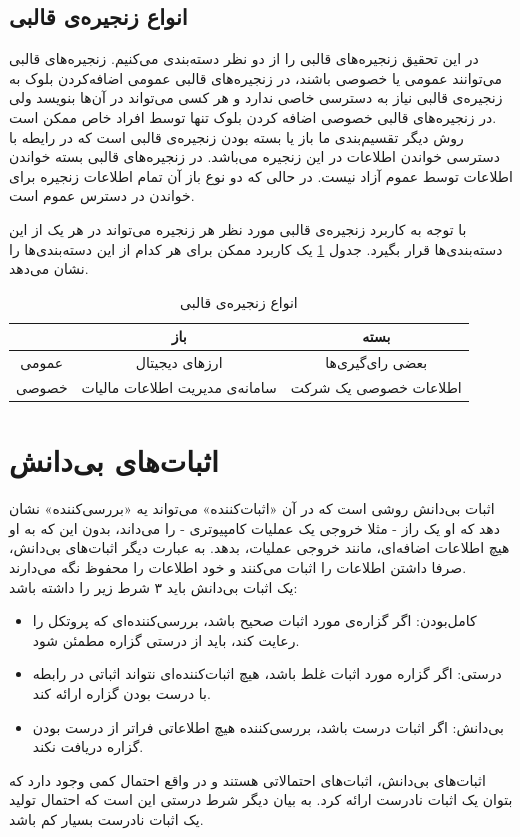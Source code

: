  \subsection{انواع زنجیره‌ی قالبی}
 در این تحقیق زنجیره‌های قالبی‌ را از دو نظر دسته‌‌بندی می‌کنیم. زنجیره‌های قالبی‌ می‌توانند عمومی یا خصوصی باشند، در زنجیره‌های قالبی‌ عمومی اضافه‌کردن بلوک به زنجیره‌ی قالبی نیاز به دسترسی خاصی ندارد و هر کسی می‌تواند در آن‌ها بنویسد ولی در زنجیره‌های قالبی خصوصی اضافه کردن بلوک تنها توسط افراد خاص ممکن است. 
 \\
 روش دیگر تقسیم‌بندی ما باز یا بسته بودن زنجیره‌ی قالبی است که در رایطه با دسترسی خواندن اطلاعات در این زنجیره می‌باشد. در زنجیره‌های قالبی‌ بسته خواندن اطلاعات توسط عموم آزاد نیست. در حالی که دو نوع باز آن تمام اطلاعات زنجیره برای خواندن در دسترس عموم است.
\par
با توجه به کاربرد زنجیره‌ی قالبی مورد نظر هر زنجیره‌ می‌تواند در هر یک از این دسته‌بندی‌ها قرار بگیرد. جدول  \ref{tab:tch} یک کاربرد ممکن برای هر کدام از این دسته‌بندی‌ها را نشان می‌دهد.

\begin{table}[h]
	\begin{center}
		\caption{انواع زنجیره‌ی قالبی}
		\begin{tabular}{|c|c|c|}
			\hline
			& باز & بسته \\
			\hline
			عمومی & ارز‌های دیجیتال & بعضی رای‌گیری‌ها \\
			\hline
			خصوصی & سامانه‌ی مدیریت اطلاعات مالیات & اطلاعات خصوصی یک شرکت \\
			\hline

		\end{tabular}
		\label{tab:tch}
	\end{center}
\end{table}


 
 
\section{اثبات‌های بی‌دانش}
اثبات‌ بی‌دانش 
روشی است که در آن «اثبات‌کننده» می‌تواند یه «بررسی‌کننده» نشان دهد که او یک راز - مثلا خروجی یک عملیات کامپیوتری - را می‌داند، بدون این که به او هیچ اطلاعات اضافه‌ای، مانند خروجی عملیات، بدهد. به عبارت دیگر اثبات‌های بی‌دانش، صرفا داشتن اطلاعات را اثبات می‌کنند و خود اطلاعات را محفوظ نگه‌ می‌دارند.
\\
یک اثبات بی‌دانش باید ۳ شرط زیر را داشته باشد:
\begin{itemize}
	\item
	کامل‌بودن: اگر گزاره‌ی مورد اثبات صحیح باشد، بررسی‌کننده‌ای که پروتکل را رعایت کند، باید از درستی گزاره مطمئن شود.
	\item 
	درستی: اگر گزاره مورد اثبات غلط باشد، هیچ اثبات‌کننده‌ای نتواند اثباتی در رابطه با درست بودن گزاره ارائه کند.
	\item 
	بی‌دانش: اگر اثبات درست باشد، بررسی‌کننده هیچ اطلاعاتی فراتر از درست بودن گزاره دریافت نکند.
\end{itemize}
اثبات‌های بی‌دانش، اثبات‌های احتمالاتی هستند و در واقع احتمال کمی وجود دارد که بتوان یک اثبات نادرست ارائه کرد. به بیان دیگر شرط درستی این است که احتمال تولید یک اثبات نادرست بسیار کم باشد. 
